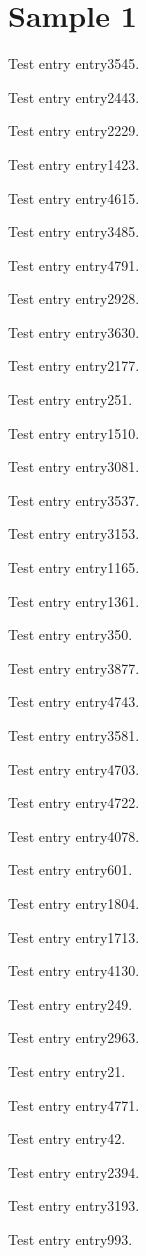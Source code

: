 \chapter{Sample 1}
Test entry \gls{entry3545}.

Test entry \gls{entry2443}.

Test entry \gls{entry2229}.

Test entry \gls{entry1423}.

Test entry \gls{entry4615}.

Test entry \gls{entry3485}.

Test entry \gls{entry4791}.

Test entry \gls{entry2928}.

Test entry \gls{entry3630}.

Test entry \gls{entry2177}.

Test entry \gls{entry251}.

Test entry \gls{entry1510}.

Test entry \gls{entry3081}.

Test entry \gls{entry3537}.

Test entry \gls{entry3153}.

Test entry \gls{entry1165}.

Test entry \gls{entry1361}.

Test entry \gls{entry350}.

Test entry \gls{entry3877}.

Test entry \gls{entry4743}.

Test entry \gls{entry3581}.

Test entry \gls{entry4703}.

Test entry \gls{entry4722}.

Test entry \gls{entry4078}.

Test entry \gls{entry601}.

Test entry \gls{entry1804}.

Test entry \gls{entry1713}.

Test entry \gls{entry4130}.

Test entry \gls{entry249}.

Test entry \gls{entry2963}.

Test entry \gls{entry21}.

Test entry \gls{entry4771}.

Test entry \gls{entry42}.

Test entry \gls{entry2394}.

Test entry \gls{entry3193}.

Test entry \gls{entry993}.

